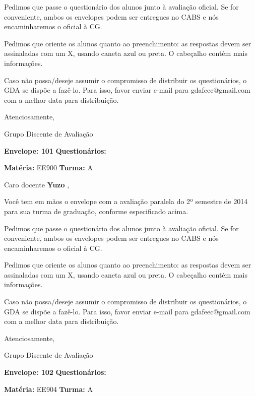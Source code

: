\documentclass[a5paper]{letter}
\begin{document}
	Pedimos que passe o questionário dos alunos junto à avaliação oficial. Se for conveniente, ambos os envelopes podem ser entregues no CABS e nós encaminharemos o oficial à CG.

Pedimos que oriente os alunos quanto ao preenchimento: as respostas devem ser assinaladas com um X, usando caneta azul ou preta. O cabeçalho contém mais informações.

	Caso não possa/deseje assumir o compromisso de distribuir os questionários, o GDA se dispõe a fazê-lo. Para isso, favor enviar e-mail para gdafeec@gmail.com com a melhor data para distribuição.


Atenciosamente, 

Grupo Discente de Avaliação

\vspace{0.5cm}

{\bf Envelope: 101 }		\hfill	{\bf Questionários:} \hspace{2cm}

\newpage
\thispagestyle{empty}

\hfill {\bf Matéria:} EE900 {\bf Turma:} A

Caro docente {\bf Yuzo }, 

	Você tem em mãos o envelope com a avaliação paralela do 2º semestre de 2014 para sua turma de graduação, conforme especificado acima.

	Pedimos que passe o questionário dos alunos junto à avaliação oficial. Se for conveniente, ambos os envelopes podem ser entregues no CABS e nós encaminharemos o oficial à CG.

Pedimos que oriente os alunos quanto ao preenchimento: as respostas devem ser assinaladas com um X, usando caneta azul ou preta. O cabeçalho contém mais informações.

	Caso não possa/deseje assumir o compromisso de distribuir os questionários, o GDA se dispõe a fazê-lo. Para isso, favor enviar e-mail para gdafeec@gmail.com com a melhor data para distribuição.


Atenciosamente, 

Grupo Discente de Avaliação

\vspace{0.5cm}

{\bf Envelope: 102 }		\hfill	{\bf Questionários:} \hspace{2cm}

\newpage
\thispagestyle{empty}

\hfill {\bf Matéria:} EE904 {\bf Turma:} A
\end{document}
